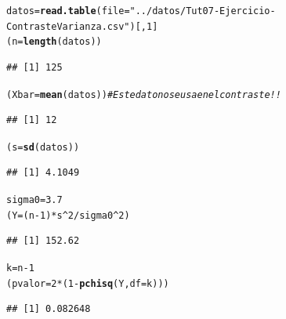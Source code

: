 \documentclass[10pt,a4paper]{article}\usepackage[]{graphicx}\usepackage[]{color}
\makeatletter
\newcommand{\hlnum}[1]{\textcolor[rgb]{0.686,0.059,0.569}{#1}}%
\newcommand{\hlstr}[1]{\textcolor[rgb]{0.192,0.494,0.8}{#1}}%
\newcommand{\hlcom}[1]{\textcolor[rgb]{0.678,0.584,0.686}{\textit{#1}}}%
\newcommand{\hlopt}[1]{\textcolor[rgb]{0,0,0}{#1}}%
\newcommand{\hlstd}[1]{\textcolor[rgb]{0.345,0.345,0.345}{#1}}%
\newcommand{\hlkwb}[1]{\textcolor[rgb]{0.69,0.353,0.396}{#1}}%
\newcommand{\hlkwc}[1]{\textcolor[rgb]{0.333,0.667,0.333}{#1}}%
\newcommand{\hlkwd}[1]{\textcolor[rgb]{0.737,0.353,0.396}{\textbf{#1}}}%
\newenvironment{kframe}{%
 \def\at@end@of@kframe{}%
 \ifinner\ifhmode%
  \def\at@end@of@kframe{\end{minipage}}%
  \begin{minipage}{\columnwidth}%
 \fi\fi%
 \def\FrameCommand##1{\hskip\@totalleftmargin \hskip-\fboxsep
 \colorbox{shadecolor}{##1}\hskip-\fboxsep
     \hskip-\linewidth \hskip-\@totalleftmargin \hskip\columnwidth}%
 \MakeFramed {\advance\hsize-\width
   \@totalleftmargin\z@ \linewidth\hsize
   \@setminipage}}%
 {\par\unskip\endMakeFramed%
 \at@end@of@kframe}
\newenvironment{knitrout}{}{} %
\newcounter {cont01}
\makeatother
\begin{document}
\begin{knitrout}
\color{fgcolor}\begin{kframe}
\begin{alltt}
\hlstd{datos} \hlkwb{=} \hlkwd{read.table}\hlstd{(}\hlkwc{file} \hlstd{=} \hlstr{"../datos/Tut07-Ejercicio-ContrasteVarianza.csv"}\hlstd{)[,}\hlnum{1}\hlstd{]}
\hlstd{(n} \hlkwb{=} \hlkwd{length}\hlstd{(datos))}
\end{alltt}
\begin{verbatim}
## [1] 125
\end{verbatim}
\begin{alltt}
\hlstd{(Xbar} \hlkwb{=} \hlkwd{mean}\hlstd{(datos))} \hlcom{# Este dato no se usa en el contraste!!}
\end{alltt}
\begin{verbatim}
## [1] 12
\end{verbatim}
\begin{alltt}
\hlstd{(s} \hlkwb{=} \hlkwd{sd}\hlstd{(datos))}
\end{alltt}
\begin{verbatim}
## [1] 4.1049
\end{verbatim}
\begin{alltt}
\hlstd{sigma0} \hlkwb{=} \hlnum{3.7}
\hlstd{(Y} \hlkwb{=} \hlstd{(n}\hlopt{-}\hlnum{1}\hlstd{)} \hlopt{*} \hlstd{s}\hlopt{^}\hlnum{2} \hlopt{/} \hlstd{sigma0}\hlopt{^}\hlnum{2}\hlstd{)}
\end{alltt}
\begin{verbatim}
## [1] 152.62
\end{verbatim}
\begin{alltt}
\hlstd{k} \hlkwb{=} \hlstd{n} \hlopt{-} \hlnum{1}
\hlstd{(pvalor} \hlkwb{=} \hlnum{2}\hlopt{*}\hlstd{(}\hlnum{1} \hlopt{-} \hlkwd{pchisq}\hlstd{(Y,} \hlkwc{df} \hlstd{= k)))}
\end{alltt}
\begin{verbatim}
## [1] 0.082648
\end{verbatim}
\end{kframe}
\end{knitrout}

%
\end{document}
